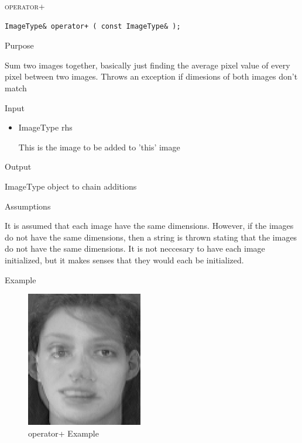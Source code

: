 \documentclass[pdftex, 11pt]{article}
\begin{document}
\begin{description}
\begin{description}
		\end{description}


	\item{\textsc{operator+}}
		\begin{description}

\begin{lstlisting}
ImageType& operator+ ( const ImageType& );
\end{lstlisting}

			\item{Purpose}

				
				Sum two images together, basically just finding
				the average pixel value of
				every pixel between two images.  Throws an
				exception if dimesions of both
				images don't match

			\item{Input}

				\begin{itemize}
						
					\item{ImageType rhs}

						This is the image to be added to
						'this' image

				\end{itemize}

			\item{Output}

				ImageType object to chain additions

			\item{Assumptions}

				It is assumed that each image have the same dimensions.
				However, if the images do not have the same dimensions,
				then a string is thrown stating that the images do
				not have the same dimensions. It is not neccesary to have
				each image initialized, but it makes senses
				that they would each be initialized.

			\item{Example}

				\begin{figure}[h]
					\centering
					\caption{operator+ Example}
				\includegraphics{images/outasum.png}
			\end{figure}



\end{description}
\end{description}
\end{document}
